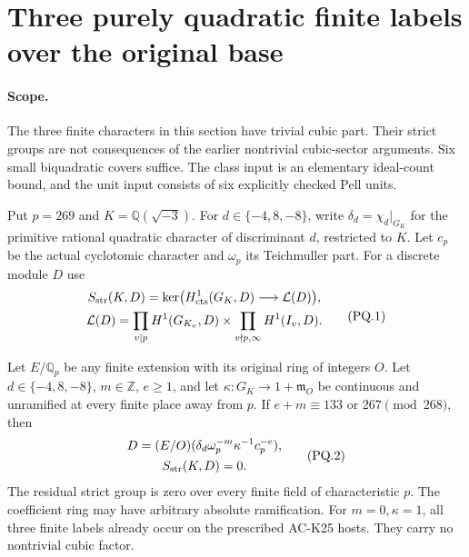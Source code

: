 \section{Three purely quadratic finite labels over the original base}
\label{sec:pure-quadratic-original-strict}

\paragraph{Scope.}
The three finite characters in this section have trivial cubic part.
Their strict groups are not consequences of the earlier nontrivial
cubic-sector arguments.  Six small biquadratic covers suffice.
The class input is an elementary ideal-count bound, and the unit
input consists of six explicitly checked Pell units.

Put $p=269$ and $K=\mathbb Q(\sqrt{-3})$.
For $d\in\{-4,8,-8\}$, write $\delta_d=\chi_d|_{G_K}$ for
the primitive rational quadratic character of discriminant $d$,
restricted to $K$.
Let $c_p$ be the actual cyclotomic character and $\omega_p$ its
Teichmuller part.  For a discrete module $D$ use
\[
 \begin{gathered}
 S_{\rm str}(K,D)=\ker\bigl(H^1_{\rm cts}(G_K,D)
                                      \longrightarrow\mathcal L(D)\bigr),\\
 \mathcal L(D)=\prod_{v\mid p}H^1(G_{K_v},D)
              \times\prod_{v\nmid p,\infty}H^1(I_v,D).
 \end{gathered}
 \tag{PQ.1}
\]

\begin{theorem}
\label{AC-G160}
Let $E/\mathbb Q_p$ be any finite extension with its original ring
of integers $O$.  Let $d\in\{-4,8,-8\}$, $m\in\mathbb Z$,
$e\geq1$, and let $\kappa:G_K\to1+\mathfrak m_O$ be continuous
and unramified at every finite place away from $p$.
If $e+m\equiv133$ or $267\pmod{268}$, then
\[
 \begin{gathered}
 D=(E/O)(\delta_d\omega_p^{-m}\kappa^{-1}c_p^{-e}),\\
                         S_{\rm str}(K,D)=0.
 \end{gathered}
 \tag{PQ.2}
\]
The residual strict group is zero over every finite field of
characteristic $p$.  The coefficient ring may have arbitrary
absolute ramification.
For $m=0,\kappa=1$, all three finite labels already occur on
the prescribed AC-K25 hosts.  They carry no nontrivial cubic factor.
\end{theorem}

